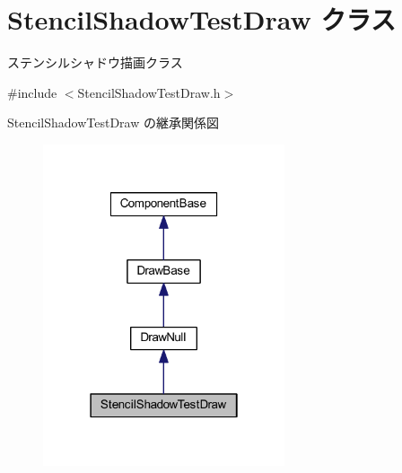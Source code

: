 \hypertarget{class_stencil_shadow_test_draw}{}\section{Stencil\+Shadow\+Test\+Draw クラス}
\label{class_stencil_shadow_test_draw}


ステンシルシャドウ描画クラス  




{\ttfamily \#include $<$Stencil\+Shadow\+Test\+Draw.\+h$>$}



Stencil\+Shadow\+Test\+Draw の継承関係図\nopagebreak
\begin{figure}[H]
\begin{center}
\leavevmode
\includegraphics[width=202pt]{class_stencil_shadow_test_draw__inherit__graph}
\end{center}
\end{figure}
